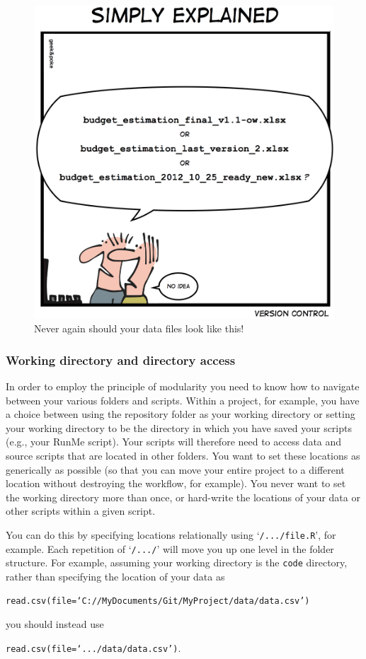 \documentclass[12pt,letterpaper]{article}
\begin{document}
\begin{figure}
	\centering
	\includegraphics[width=0.5\linewidth]{figs/datafilenames.jpg}
	\caption{Never again should your data files look like this!}
	\label{fig:datafilenames}
\end{figure}

\subsubsection{Working directory and directory access}
In order to employ the principle of modularity you need to know how to navigate between your various folders and scripts.  Within a project, for example, you have a choice between using the repository folder as your working directory or setting your working directory to be the directory in which you have saved your scripts (e.g., your RunMe script). Your scripts will therefore need to access data and source scripts that are located in other folders.  You want to set these locations as generically as possible (so that you can move your entire project to a different location without destroying the workflow, for example).  You never want to set the working directory more than once, or hard-write the locations of your data or other scripts within a given script.  

You can do this by specifying locations relationally using `\texttt{/.../file.R}', for example. Each repetition of `\texttt{/.../}' will move you up one level in the folder structure.   For example, assuming your working directory is the \texttt{code} directory, rather than specifying the location of your data as

\texttt{read.csv(file=`C://MyDocuments/Git/MyProject/data/data.csv')}

you should instead use

\texttt{read.csv(file=`.../data/data.csv')}.
\end{document}
